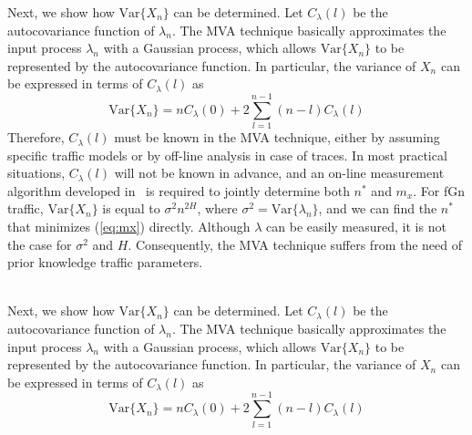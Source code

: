 \documentclass[12pt,oneside,openright,a4paper]{explo-thai-project}
\begin{document}
Next, we show how $\mathrm{Var}\{X_n\}$ can be determined.  Let
$C_{\lambda}(l)$ be the autocovariance function of $\lambda_n$.  The
MVA technique basically approximates the input process $\lambda_n$
with a Gaussian process, which allows $\mathrm{Var}\{X_n\}$ to be
represented by the autocovariance function.  In particular, the
variance of $X_n$ can be expressed in terms of $C_{\lambda}(l)$ as
\begin{equation}
  \mathrm{Var}\{X_n\} = nC_{\lambda}(0) + 2\sum_{l=1}^{n-1} (n-l)C_{\lambda}(l)
\end{equation} 
Therefore, $C_{\lambda}(l)$ must be known in the MVA technique, either
by assuming specific traffic models or by off-line analysis in case of
traces.  In most practical situations, $C_{\lambda}(l)$ will not be
known in advance, and an on-line measurement algorithm developed
in~\cite{eun01} is required to jointly determine both $n^\ast$ and
$m_x$. For fGn traffic, $\mathrm{Var}\{X_n\}$ is equal to $\sigma^2
n^{2H}$, where $\sigma^2 = \mathrm{Var}\{\lambda_n\}$, and we can find
the $n^\ast$ that minimizes (\ref{eq:mx}) directly. Although $\lambda$
can be easily measured, it is not the case for $\sigma^2$ and $H$.
Consequently, the MVA technique suffers from the need of prior
knowledge traffic parameters.



 \\

Next, we show how $\mathrm{Var}\{X_n\}$ can be determined.  Let
$C_{\lambda}(l)$ be the autocovariance function of $\lambda_n$.  The
MVA technique basically approximates the input process $\lambda_n$
with a Gaussian process, which allows $\mathrm{Var}\{X_n\}$ to be
represented by the autocovariance function.  In particular, the
variance of $X_n$ can be expressed in terms of $C_{\lambda}(l)$ as
\begin{equation}
  \mathrm{Var}\{X_n\} = nC_{\lambda}(0) + 2\sum_{l=1}^{n-1} (n-l)C_{\lambda}(l)
\end{equation} 

 \\
\end{document}
